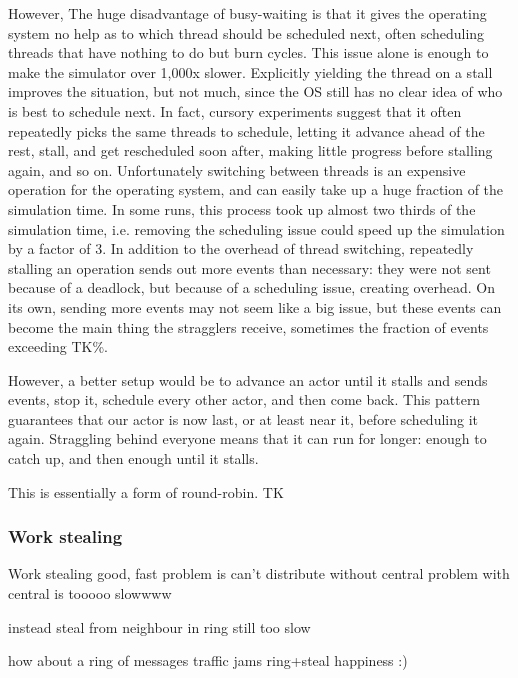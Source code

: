 However, The huge disadvantage of busy-waiting is that it gives the operating system no help as to which thread should be scheduled next, often scheduling threads that have nothing to do but burn cycles.
This issue alone is enough to make the simulator over 1,000x slower. %
Explicitly yielding the thread on a stall improves the situation, but not much, since the OS still has no clear idea of who is best to schedule next. %
In fact, cursory experiments suggest that it often repeatedly picks the same threads to schedule, letting it advance ahead of the rest, stall, and get rescheduled soon after, making little progress before stalling again, and so on.
Unfortunately switching between threads is an expensive operation for the operating system, and can easily take up a huge fraction of the simulation time.
In some runs, this process took up almost two thirds of the simulation time, i.e. removing the scheduling issue could speed up the simulation by a factor of 3. %
In addition to the overhead of thread switching, repeatedly stalling an operation sends out more  events than necessary: they were not sent because of a deadlock, but because of a scheduling issue, creating overhead.
On its own, sending more events may not seem like a big issue, but these  events can become the main thing the stragglers receive, sometimes the fraction of  events exceeding TK\%. %

However, a better setup would be to advance an actor until it stalls and sends  events, stop it, schedule every other actor, and then come back.
This pattern guarantees that our actor is now last, or at least near it, before scheduling it again.
Straggling behind everyone means that it can run for longer: enough to catch up, and then enough until it stalls.

This is essentially a form of round-robin.
TK

\subsubsection{Work stealing}

Work stealing good, fast
problem is can't distribute without central
problem with central is tooooo slowwww

instead steal from neighbour in ring
still too slow

how about a ring of messages
traffic jams
ring+steal
happiness :)
